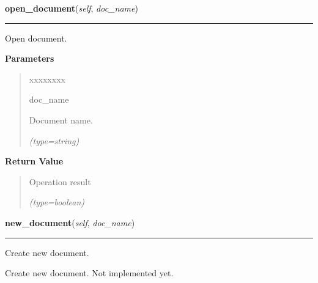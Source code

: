     \label{src:pylibratm:Template:open_document}

    \vspace{0.5ex}

\hspace{.8\funcindent}\begin{boxedminipage}{\funcwidth}

    \raggedright \textbf{open\_document}(\textit{self}, \textit{doc\_name})

    \vspace{-1.5ex}

    \rule{\textwidth}{0.5\fboxrule}
\setlength{\parskip}{2ex}
    Open document.

\setlength{\parskip}{1ex}
      \textbf{Parameters}
      \vspace{-1ex}

      \begin{quote}
        \begin{Ventry}{xxxxxxxx}

          \item[doc\_name]

          Document name.

            {\it (type=string)}

        \end{Ventry}

      \end{quote}

      \textbf{Return Value}
    \vspace{-1ex}

      \begin{quote}
      Operation result

      {\it (type=boolean)}

      \end{quote}

    \end{boxedminipage}

    \label{src:pylibratm:Template:new_document}

    \vspace{0.5ex}

\hspace{.8\funcindent}\begin{boxedminipage}{\funcwidth}

    \raggedright \textbf{new\_document}(\textit{self}, \textit{doc\_name})

    \vspace{-1.5ex}

    \rule{\textwidth}{0.5\fboxrule}
\setlength{\parskip}{2ex}
    Create new document.

    Create new document. Not implemented yet.

\setlength{\parskip}{1ex}
    \end{boxedminipage}

